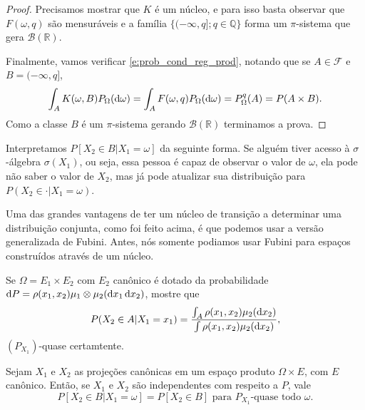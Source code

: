 \begin{proof}
  Precisamos mostrar que $K$ é um núcleo, e para isso basta observar que $F(\omega, q)$ são mensuráveis e a família $\{(-\infty, q]; q \in \mathbb{Q}\}$ forma um $\pi$-sistema que gera $\mathcal{B}(\mathbb{R})$.

  Finalmente, vamos verificar \eqref{e:prob_cond_reg_prod}, notando que se $A \in \mathcal{F}$ e $B = (-\infty, q]$,
  \begin{equation}
    \int_A K(\omega, B) P_\Omega(\mathop{}\!\mathrm{d} \omega) = \int_A F(\omega, q) P_\Omega (\mathop{}\!\mathrm{d} \omega) = P^q_\Omega(A) = P(A \times B).
  \end{equation}
  Como a classe $B$ é um $\pi$-sistema gerando $\mathcal{B}(\mathbb{R})$ terminamos a prova.
\end{proof}

Interpretamos $P[X_2 \in B | X_1 = \omega]$ da seguinte forma.
Se alguém tiver acesso à $\sigma$-álgebra $\sigma(X_1)$, ou seja, essa pessoa é capaz de observar o valor de $\omega$, ela pode não saber o valor de $X_2$, mas já pode atualizar sua distribuição para $P(X_2 \in \cdot| X_1 = \omega)$.

Uma das grandes vantagens de ter um núcleo de transição a determinar uma distribuição conjunta, como foi feito acima, é que podemos usar a versão generalizada de Fubini.
Antes, nós somente podiamos usar Fubini para espaços construídos através de um núcleo.

\begin{exercise}
  Se $\Omega = E_1 \times E_2$ com $E_2$ canônico é dotado da probabilidade $\mathop{}\!\mathrm{d} P = \rho(x_1, x_2) \mu_1 \otimes \mu_2 (\mathop{}\!\mathrm{d} x_1 \mathop{}\!\mathrm{d} x_2)$, mostre que
  \begin{equation}
    P(X_2 \in A|X_1 = x_1) = \frac{\int_A \rho(x_1, x_2) \mu_2(\mathop{}\!\mathrm{d} x_2)}{\int \rho(x_1, x_2) \mu_2(\mathop{}\!\mathrm{d} x_2)},
  \end{equation}
  $(P_{X_1})$-quase certamtente.
\end{exercise}

\begin{exercise}
  \label{x:prob_cond_reg_indep}
  Sejam $X_1$ e $X_2$ as projeções canônicas em um espaço produto $\Omega \times E$, com $E$ canônico.
  Então, se $X_1$ e $X_2$ são independentes com respeito a $P$, vale
  \begin{equation}
    P[X_2 \in B | X_1 = \omega] = P[X_2 \in B] \text{ para $P_{X_1}$-quase todo $\omega$}.
  \end{equation}
\end{exercise}

